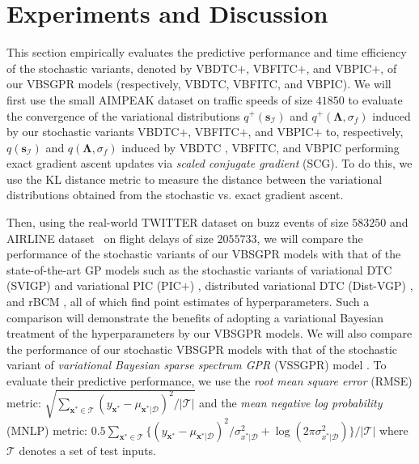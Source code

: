 \documentclass[conference]{IEEEtran}
\begin{document}
\section{Experiments and Discussion}
	\label{Experiments and Discussion}%
	This section empirically evaluates the predictive performance and time efficiency of the stochastic variants, denoted by VBDTC$+$, VBFITC$+$, and VBPIC$+$, of our VBSGPR models (respectively, VBDTC, VBFITC, and VBPIC).
We will first use the small AIMPEAK dataset \cite{LowUAI13} on traffic speeds of size $41850$ to  evaluate the convergence of the variational distributions $q^+(\mathbf{s}_\mathcal{I})$ and $q^+(\mathbf{\Lambda},\sigma_f)$ induced by our stochastic variants VBDTC$+$, VBFITC$+$, and VBPIC$+$ to, respectively, $q(\mathbf{s}_\mathcal{I})$ and $q(\mathbf{\Lambda},\sigma_f)$ induced by VBDTC \cite{Titsias13}, VBFITC, and VBPIC performing exact gradient ascent updates via \emph{scaled conjugate gradient} (SCG).
To do this, we use the KL distance metric to measure the distance between the variational distributions obtained from the stochastic vs. exact gradient ascent.	

Then, using the real-world TWITTER dataset 
on buzz events of size $583250$ and AIRLINE dataset~\cite{Lawrence13} on flight delays of size $2055733$, we will compare the performance of the stochastic variants of our VBSGPR models with that of the state-of-the-art GP models such as the stochastic variants of variational DTC (SVIGP) \cite{Lawrence13} and variational PIC (PIC$+$) \cite{NghiaICML15}, distributed variational DTC (Dist-VGP) \cite{Yarin14}, and rBCM \cite{deisenroth2015distributed}, all of which find point estimates of hyperparameters.
Such a comparison will demonstrate the benefits of adopting a variational Bayesian treatment of the hyperparameters by our VBSGPR models.
We will also compare the performance of our stochastic VBSGPR models with that of the stochastic variant of \emph{variational Bayesian sparse spectrum GPR} (VSSGPR) model \cite{Gal2015Improving}. 
To evaluate their predictive performance, we use the \emph{root mean square error} (RMSE) metric: $\sqrt{\sum_{\mathbf{x}^*\in\mathcal{T}}(y_{\mathbf{x}^*}-\mu_{\mathbf{x}^*|\mathcal{D}})^2/|\mathcal{T}|}$ and 
the \emph{mean negative log probability} (MNLP) metric: $0.5\sum_{\mathbf{x}^*\in\mathcal{T}}\{(y_{\mathbf{x}^*}-\mu_{\mathbf{x}^*|\mathcal{D}})^2 / \sigma^2_{x^*|\mathcal{D}} + \log(2\pi\sigma^2_{x^*|\mathcal{D}})\} / |\mathcal{T}|$ 
where $\mathcal{T}$ denotes a set of test inputs.
\end{document}
